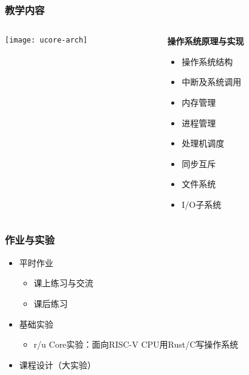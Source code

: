 \begin{frame}
	\frametitle{教学内容}

	\begin{columns}

	\begin{column}{0.5\textwidth}
	
    \texttt{[image: ucore-arch]}
    
    \end{column}
	
	\begin{column}{0.5\textwidth}
	\textbf{操作系统原理与实现}
    \begin{itemize}
		\item 操作系统结构
		\item 中断及系统调用 %
		\item 内存管理
		\item 进程管理
		\item 处理机调度
		\item 同步互斥 %
		\item 文件系统
		\item I/O子系统
    \end{itemize}
    
    \end{column}

\end{columns}

\end{frame}


    \begin{frame}
        \frametitle{作业与实验}
        \begin{itemize}
            \item 平时作业
        \begin{itemize}
    		\item 课上练习与交流
	    	\item 课后练习
        \end{itemize} %

            \item 基础实验
    \begin{itemize}
		\item r/u Core实验：面向RISC-V CPU用Rust/C写操作系统
    \end{itemize}
            \item 课程设计（大实验）
        \end{itemize}
\end{frame}

